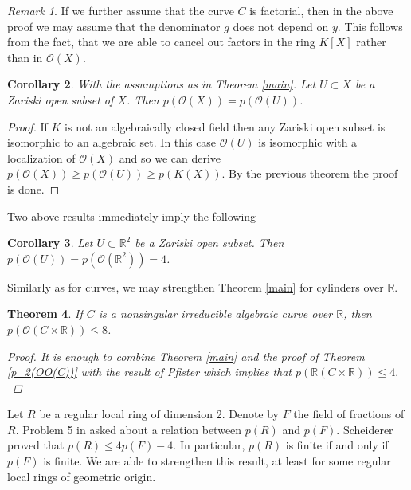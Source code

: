\documentclass[12pt,reqno]{amsart}   	%
\newtheorem{thm}{Theorem}[section]
\newtheorem{cor}[thm]{Corollary}
\theoremstyle{obs}
\theoremstyle{prob}
\theoremstyle{conj}
\theoremstyle{remark}
\newtheorem{remark}[thm]{Remark}
\newcommand{\R}{\mathbb{R}}
\newcommand{\OO}{\mathcal{O}}
\begin{document}
\begin{remark}
If we further assume that the curve $C$ is factorial, then in the above proof we may assume that the denominator $g$ does not depend on $y$. This follows from the fact, that we are able to cancel out factors in the ring $K[X]$ rather than in $\OO(X)$.

\end{remark}




\begin{cor}\label{cor:p(O(X))=p(O(U))}
With the assumptions as in Theorem \ref{main}. Let  $U \subset X$ be a Zariski open subset of $X$. Then $p(\OO(X))=p(\OO(U))$.
\end{cor}
\begin{proof}
If $K$ is not an algebraically closed field then any Zariski open subset is isomorphic to an algebraic set. In this case $\OO(U)$ is isomorphic with a localization of $\OO(X)$ and so we can derive
$p(\OO(X))\geq p(\OO(U)) \geq p(K(X))$. By the previous theorem the proof is done.
\end{proof}

Two above results immediately imply the following
\begin{cor}
Let $U \subset \R^2$ be a Zariski open subset. Then $p(\OO(U))=p(\OO(\R^2))=4$.
\end{cor}

Similarly as for curves, we may strengthen Theorem \ref{main} for cylinders over $\R$.

\begin{thm}
If $C$ is a nonsingular irreducible algebraic curve over $\R$, then ${p(\OO(C\times \R)) \leq 8}$.

\begin{proof}
It is enough to combine Theorem \ref{main} and the proof of Theorem \ref{p_2(OO(C))} with the result of Pfister  \cite[Corollary 3.4]{pfister1995} which implies that $p(\R(C\times \R)) \leq 4.$
\end{proof}
\end{thm}



Let $R$ be a regular local ring of dimension 2. Denote by $F$ the field of fractions of $R$. Problem 5 in \cite{cldr1982} asked about a relation between $p(R)$ and $p(F)$. Scheiderer \cite{scheiderer2001} proved that $p(R)\leq 4p(F)-4$. In particular, $p(R)$ is finite if and only if $p(F)$ is finite. We are able to strengthen this result, at least for some regular local rings of geometric origin.
\end{document}
